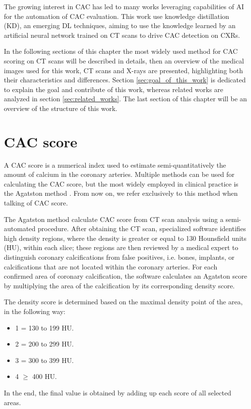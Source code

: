 The growing interest in CAC has led to many works \cite{vanvelzen2021ai} leveraging capabilities of AI for the automation of CAC evaluation.
This work use knowledge distillation (KD), an emerging DL techniques, aiming to use the knowledge learned by an artificial neural network trained on CT scans to drive CAC detection on CXRs.

In the following sections of this chapter the most widely used method for CAC scoring on CT scans will be described in details, then an overview of the medical images used for this work, CT scans and X-rays are presented, highlighting both their characteristics and differences.
Section \ref{sec:goal_of_this_work} is dedicated to explain the goal and contribute of this work, whereas related works are analyzed in section \ref{sec:related_works}.
The last section of this chapter will be an overview of the structure of this work.


\section{CAC score}

A CAC score is a numerical index used to estimate semi-quantitatively the amount of calcium in the coronary arteries\cite{Czaja-Ziolkowska2022-pd}.
Multiple methods can be used for calculating the CAC score, but the most widely employed in clinical practice is the Agatston method \cite{AGATSTON1990827}.
From now on, we refer exclusively to this method when talking of CAC score.

The Agatston method calculate CAC score from CT scan analysis using a semi-automated procedure.
After obtaining the CT scan, specialized software identifies high density regions, where the density is greater or equal to 130 Hounsfield units (HU), within each slice;
these regions are then reviewed by a medical expert to distinguish coronary calcifications from false positives, i.e. bones, implants, or calcifications that are not located within the coronary arteries.
For each confirmed area of coronary calcification, the software calculates an Agatston score by multiplying the area of the calcification by its corresponding density score.

The density score is determined based on the maximal density point of the area, in the following way:
\begin{itemize}
    \item 1 = 130 to 199 HU.
    \item  2 = 200 to 299 HU.
    \item 3 = 300 to 399 HU.
    \item 4 $\ge$ 400 HU. 
\end{itemize}
In the end, the final value is obtained by adding up each score of all selected areas.

